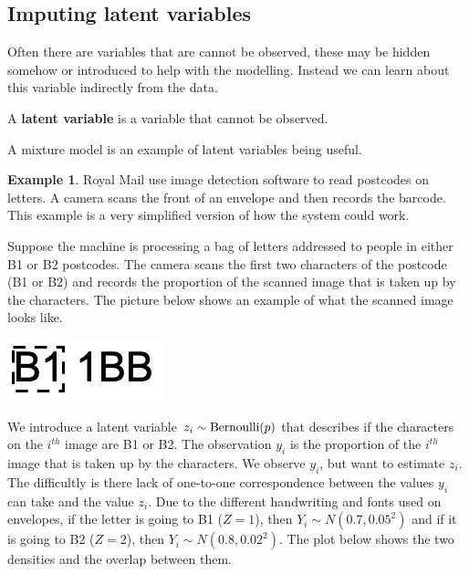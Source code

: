 \documentclass[
]{book}
\theoremstyle{definition}
\theoremstyle{definition}
\newtheorem{example}{Example}[chapter]
\theoremstyle{definition}
\theoremstyle{definition}
\theoremstyle{remark}
\begin{document}
\hypertarget{imputing-latent-variables}{%
\subsection{Imputing latent variables}\label{imputing-latent-variables}}

Often there are variables that are cannot be observed, these may be hidden somehow or introduced to help with the modelling. Instead we can learn about this variable indirectly from the data.

A \textbf{latent variable} is a variable that cannot be observed.

A mixture model is an example of latent variables being useful.

\begin{example}

Royal Mail use image detection software to read postcodes on letters. A camera scans the front of an envelope and then records the barcode. This example is a very simplified version of how the system could work.

Suppose the machine is processing a bag of letters addressed to people in either B1 or B2 postcodes. The camera scans the first two characters of the postcode (B1 or B2) and records the proportion of the scanned image that is taken up by the characters. The picture below shows an example of what the scanned image looks like.

\includegraphics{postcode.jpeg}

We introduce a latent variable \(z_i \sim \hbox{Bernoulli}(p)\) that describes if the characters on the \(i^{th}\) image are B1 or B2. The observation \(y_i\) is the proportion of the \(i^{th}\) image that is taken up by the characters. We observe \(y_i\), but want to estimate \(z_i\). The difficultly is there lack of one-to-one correspondence between the values \(y_i\) can take and the value \(z_i\). Due to the different handwriting and fonts used on envelopes, if the letter is going to B1 (\(Z = 1\)), then \(Y_i \sim N(0.7, 0.05^2)\) and if it is going to B2 (\(Z = 2\)), then \(Y_i \sim N(0.8, 0.02^2)\). The plot below shows the two densities and the overlap between them.


\end{example}
\end{document}
